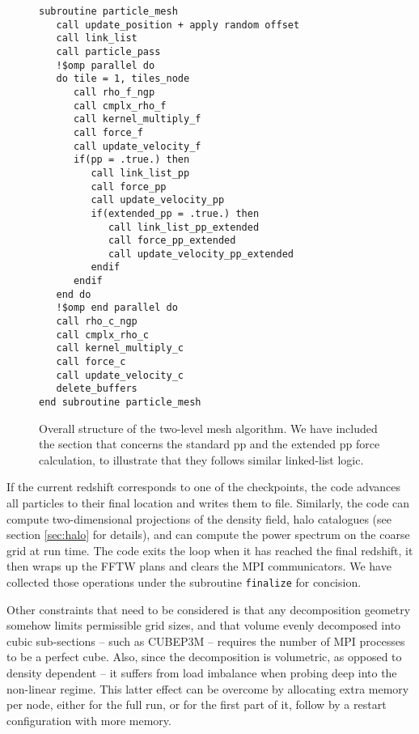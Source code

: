 \begin{figure}
\begin{verbatim}
subroutine particle_mesh
   call update_position + apply random offset
   call link_list
   call particle_pass
   !$omp parallel do
   do tile = 1, tiles_node
      call rho_f_ngp
      call cmplx_rho_f
      call kernel_multiply_f
      call force_f
      call update_velocity_f
      if(pp = .true.) then       
         call link_list_pp
         call force_pp
         call update_velocity_pp
         if(extended_pp = .true.) then
            call link_list_pp_extended
            call force_pp_extended
            call update_velocity_pp_extended       
         endif
      endif
   end do
   !$omp end parallel do
   call rho_c_ngp
   call cmplx_rho_c
   call kernel_multiply_c
   call force_c
   call update_velocity_c      
   delete_buffers
end subroutine particle_mesh
\end{verbatim}
\caption{Overall structure of the two-level mesh algorithm. We have included the section that concerns the standard pp and the extended pp force calculation, to illustrate that they follows similar linked-list logic. }
\label{fig:particle_mesh}
\end{figure}


If the current redshift corresponds to one of the checkpoints, the code advances all particles to their final location
and writes them to file. Similarly, the code can compute two-dimensional projections of the density field, halo catalogues (see section \ref{sec:halo} for details), and can compute the power spectrum on the coarse grid at run time. 
The code exits the loop when it has reached the final redshift, it then wraps up the {\small FFTW} plans 
and clears the {\small MPI} communicators. We have collected those operations under the subroutine {\tt finalize} for concision.

Other constraints that need to be considered is that any decomposition geometry somehow 
limits permissible grid sizes, and that volume evenly decomposed into cubic sub-sections 
--  such as {\small CUBEP3M} -- requires the number of {\small MPI} processes to be a perfect cube.
Also,  since the decomposition is volumetric, as opposed to density dependent -- 
it suffers from load imbalance when probing deep into the non-linear regime.
This latter effect can be overcome by allocating extra memory per node, either for the full run,
or for the first part of it, follow by a restart configuration with more memory.
